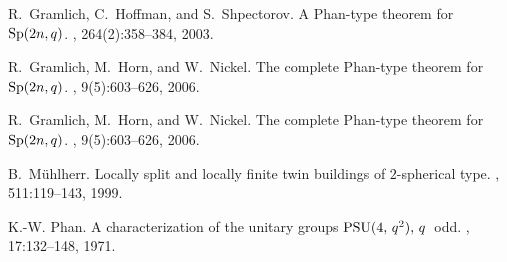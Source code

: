 \documentclass[12pt]{amsart}
\theoremstyle{definition}
\begin{document}
\begin{thebibliography}{10}

R.~Gramlich, C.~Hoffman, and S.~Shpectorov.
\newblock A {P}han-type theorem for {${\rm Sp}(2n,q)$}.
, 264(2):358--384, 2003.

%

R.~Gramlich, M.~Horn, and W.~Nickel.
\newblock The complete {P}han-type theorem for {${\rm Sp}(2n,q)$}.
, 9(5):603--626, 2006.


R.~Gramlich, M.~Horn, and W.~Nickel.
\newblock The complete {P}han-type theorem for {${\rm Sp}(2n,q)$}.
, 9(5):603--626, 2006.

%
%
%
%
B.~M{\"u}hlherr.
\newblock Locally split and locally finite twin buildings of {$2$}-spherical
  type.
, 511:119--143, 1999.

%
%
%
K.-W. Phan.
\newblock A characterization of the unitary groups {${\rm
  PSU}(4,\,q^{2}),\,q$}\ odd.
, 17:132--148, 1971.


\end{thebibliography}
\end{document}
